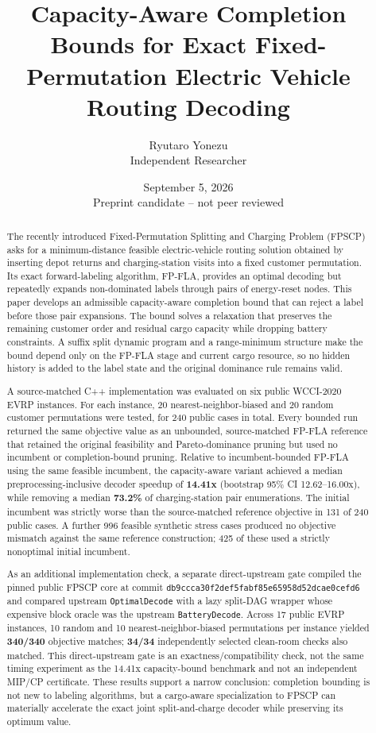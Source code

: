 \documentclass[11pt]{article}
\title{Capacity-Aware Completion Bounds for Exact Fixed-Permutation Electric Vehicle Routing Decoding}
\author{Ryutaro Yonezu\\Independent Researcher}
\date{September 5, 2026\\Preprint candidate -- not peer reviewed}
\begin{document}
\maketitle

\begin{abstract}
The recently introduced Fixed-Permutation Splitting and Charging Problem (FPSCP) asks for a minimum-distance feasible electric-vehicle routing solution obtained by inserting depot returns and charging-station visits into a fixed customer permutation. Its exact forward-labeling algorithm, FP-FLA, provides an optimal decoding but repeatedly expands non-dominated labels through pairs of energy-reset nodes. This paper develops an admissible capacity-aware completion bound that can reject a label before those pair expansions. The bound solves a relaxation that preserves the remaining customer order and residual cargo capacity while dropping battery constraints. A suffix split dynamic program and a range-minimum structure make the bound depend only on the FP-FLA stage and current cargo resource, so no hidden history is added to the label state and the original dominance rule remains valid.

A source-matched C++ implementation was evaluated on six public WCCI-2020 EVRP instances. For each instance, 20 nearest-neighbor-biased and 20 random customer permutations were tested, for 240 public cases in total. Every bounded run returned the same objective value as an unbounded, source-matched FP-FLA reference that retained the original feasibility and Pareto-dominance pruning but used no incumbent or completion-bound pruning. Relative to incumbent-bounded FP-FLA using the same feasible incumbent, the capacity-aware variant achieved a median preprocessing-inclusive decoder speedup of \textbf{14.41x} (bootstrap 95\% CI 12.62--16.00x), while removing a median \textbf{73.2\%} of charging-station pair enumerations. The initial incumbent was strictly worse than the source-matched reference objective in 131 of 240 public cases. A further 996 feasible synthetic stress cases produced no objective mismatch against the same reference construction; 425 of these used a strictly nonoptimal initial incumbent.

As an additional implementation check, a separate direct-upstream gate compiled the pinned public FPSCP core at commit \texttt{db9ccca30f2def5fabf85e65958d52dcae0cefd6} and compared upstream \texttt{OptimalDecode} with a lazy split-DAG wrapper whose expensive block oracle was the upstream \texttt{BatteryDecode}. Across 17 public EVRP instances, 10 random and 10 nearest-neighbor-biased permutations per instance yielded \textbf{340/340} objective matches; \textbf{34/34} independently selected clean-room checks also matched. This direct-upstream gate is an exactness/compatibility check, not the same timing experiment as the 14.41x capacity-bound benchmark and not an independent MIP/CP certificate. These results support a narrow conclusion: completion bounding is not new to labeling algorithms, but a cargo-aware specialization to FPSCP can materially accelerate the exact joint split-and-charge decoder while preserving its optimum value.
\end{abstract}
\end{document}
